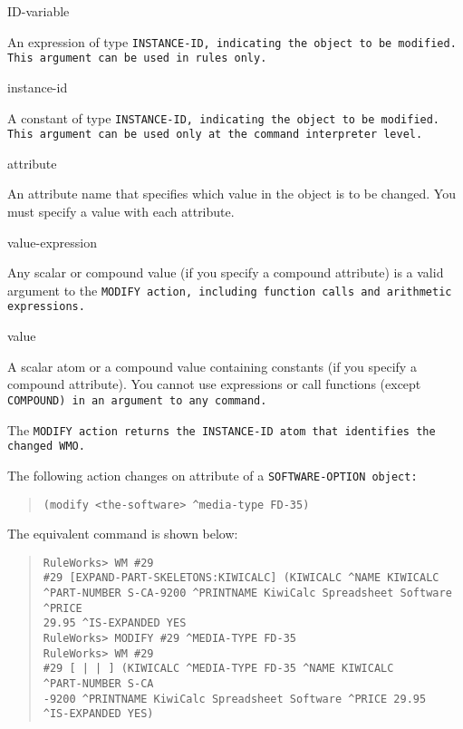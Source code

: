 \begin{arguments}
\item[ID-variable]

  An expression of type \tt{INSTANCE-ID}, indicating the object to be
  modified. This argument can be used in rules only.

\item[instance-id]

  A constant of type \tt{INSTANCE-ID}, indicating the object to be
  modified. This argument can be used only at the command interpreter
  level.

\item[attribute]

  An attribute name that specifies which value in the object is to be
  changed. You must specify a value with each attribute.

\item[value-expression]

  Any scalar or compound value (if you specify a compound attribute)
  is a valid argument to the \tt{MODIFY} action, including function
  calls and arithmetic expressions.

\item[value]

  A scalar atom or a compound value containing constants (if you
  specify a compound attribute). You cannot use expressions or call
  functions (except \tt{COMPOUND}) in an argument to any command.
\end{arguments}

\ReturnValue

The \tt{MODIFY} action returns the \tt{INSTANCE-ID} atom that
identifies the changed WMO.

\Example

The following action changes on attribute of a \tt{SOFTWARE-OPTION}
object:

\begin{quote}
\begin{verbatim}
(modify <the-software> ^media-type FD-35)
\end{verbatim}
\end{quote}

The equivalent command is shown below:

\begin{quote}
\begin{verbatim}
RuleWorks> WM #29
#29 [EXPAND-PART-SKELETONS:KIWICALC] (KIWICALC ^NAME KIWICALC
^PART-NUMBER S-CA-9200 ^PRINTNAME KiwiCalc Spreadsheet Software ^PRICE
29.95 ^IS-EXPANDED YES
RuleWorks> MODIFY #29 ^MEDIA-TYPE FD-35
RuleWorks> WM #29
#29 [ | | ] (KIWICALC ^MEDIA-TYPE FD-35 ^NAME KIWICALC
^PART-NUMBER S-CA
-9200 ^PRINTNAME KiwiCalc Spreadsheet Software ^PRICE 29.95
^IS-EXPANDED YES)
\end{verbatim}
\end{quote}

